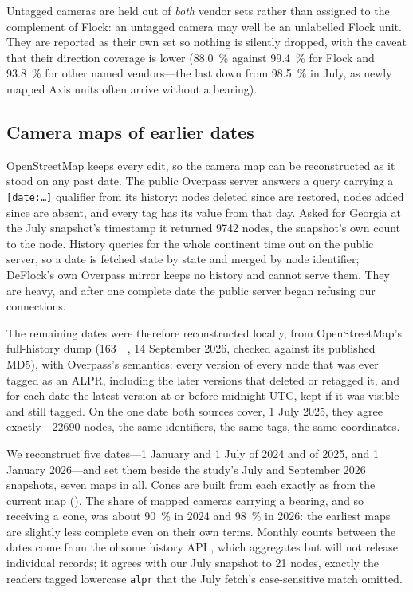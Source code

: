 \documentclass[11pt,twoside]{article}
\newcommand{\alpr}{ALPR\xspace}
\begin{document}
Untagged cameras are held out of \emph{both} vendor sets rather than assigned to the
complement of Flock: an untagged camera may well be an unlabelled Flock unit. They are reported as their own set so nothing is silently dropped,
with the caveat that their direction coverage is lower (\SI{88.0}{\percent} against
\SI{99.4}{\percent} for Flock and \SI{93.8}{\percent} for other named vendors---the last
down from \SI{98.5}{\percent} in July, as newly mapped Axis units often arrive without a
bearing).

\subsection{Camera maps of earlier dates}
\label{sec:data:history}

OpenStreetMap keeps every edit, so the camera map can be reconstructed as it stood on any
past date. The public Overpass server answers a query carrying a \texttt{[date:\ldots]}
qualifier from its history: nodes deleted since are restored, nodes added since are absent,
and every tag has its value from that day. Asked for Georgia at the July snapshot's
timestamp it returned \num{9742} nodes, the snapshot's own count to the node. History
queries for the whole continent time out on the public server, so a date is
fetched state by state and merged by node identifier; DeFlock's own Overpass mirror keeps
no history and cannot serve them. They are heavy, and after one complete date the public
server began refusing our connections.

The remaining dates were therefore reconstructed locally, from OpenStreetMap's full-history
dump \citep{osmplanet} (\SI{163}{\giga\byte}, 14 September 2026, checked against its published MD5), with
Overpass's semantics: every version of every node that was ever tagged as an \alpr,
including the later versions that deleted or retagged it, and for each date the latest
version at or before midnight UTC, kept if it was visible and still tagged. On the one date
both sources cover, 1 July 2025, they agree exactly---\num{22690} nodes, the same
identifiers, the same tags, the same coordinates.

We reconstruct five dates---1 January and 1 July of 2024 and of 2025, and 1 January
2026---and set them beside the study's July and September 2026 snapshots, seven maps in
all. Cones are built from each exactly as from the current map ().
The share of mapped cameras carrying a bearing, and so receiving a cone, was about
\SI{90}{\percent} in 2024 and \SI{98}{\percent} in 2026: the earliest maps are slightly
less complete even on their own terms. Monthly counts between the dates come from
the ohsome history API \citep{raifer2019}, which aggregates but will not release individual records; it
agrees with our July snapshot to 21 nodes, exactly the readers tagged lowercase
\texttt{alpr} that the July fetch's case-sensitive match omitted.
\end{document}
